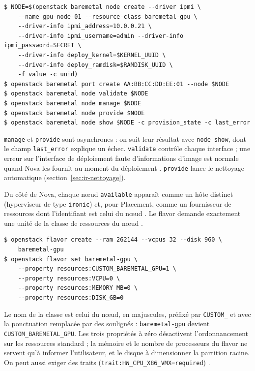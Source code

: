 \par\noindent\begin{minipage}{\linewidth}
\begin{lstlisting}[style=terminal]
$ NODE=$(openstack baremetal node create --driver ipmi \
    --name gpu-node-01 --resource-class baremetal-gpu \
    --driver-info ipmi_address=10.0.0.21 \
    --driver-info ipmi_username=admin --driver-info ipmi_password=SECRET \
    --driver-info deploy_kernel=$KERNEL_UUID \
    --driver-info deploy_ramdisk=$RAMDISK_UUID \
    -f value -c uuid)
$ openstack baremetal port create AA:BB:CC:DD:EE:01 --node $NODE
$ openstack baremetal node validate $NODE
$ openstack baremetal node manage $NODE
$ openstack baremetal node provide $NODE
$ openstack baremetal node show $NODE -c provision_state -c last_error
\end{lstlisting}
\end{minipage}\par

\texttt{manage} et \texttt{provide} sont asynchrones : on suit leur résultat avec \texttt{node show}, dont le champ
\texttt{last\_\allowbreak error} explique un échec. \texttt{validate} contrôle chaque interface ; une erreur sur l'interface de
déploiement faute d'informations d'image est normale quand Nova les fournit au moment du déploiement
\parencite{ironic-enrollment}. \texttt{provide} lance le nettoyage automatique (section~\ref{sec:ir-nettoyage}).

Du côté de Nova, chaque nœud \texttt{available} apparaît comme un hôte distinct (hyperviseur de type \texttt{ironic}) et, pour
Placement, comme un fournisseur de ressources dont l'identifiant est celui du nœud \parencite{ironic-troubleshooting}. Le
flavor demande exactement une unité de la classe de ressources du nœud \parencite{ironic-nova-flavors}.

\par\noindent\begin{minipage}{\linewidth}
\begin{lstlisting}[style=terminal]
$ openstack flavor create --ram 262144 --vcpus 32 --disk 960 \
    baremetal-gpu
$ openstack flavor set baremetal-gpu \
    --property resources:CUSTOM_BAREMETAL_GPU=1 \
    --property resources:VCPU=0 \
    --property resources:MEMORY_MB=0 \
    --property resources:DISK_GB=0
\end{lstlisting}
\end{minipage}\par

Le nom de la classe est celui du nœud, en majuscules, préfixé par \texttt{CUSTOM\_} et avec la ponctuation remplacée par des
soulignés : \texttt{baremetal-gpu} devient \texttt{CUSTOM\_\allowbreak BAREMETAL\_\allowbreak GPU}. Les trois propriétés à zéro
désactivent l'ordonnancement sur les ressources standard ; la mémoire et le nombre de processeurs du flavor ne servent qu'à
informer l'utilisateur, et le disque à dimensionner la partition racine. On peut aussi exiger des traits
(\texttt{trait:HW\_CPU\_X86\_VMX=required}) \parencite{ironic-nova-flavors}.

